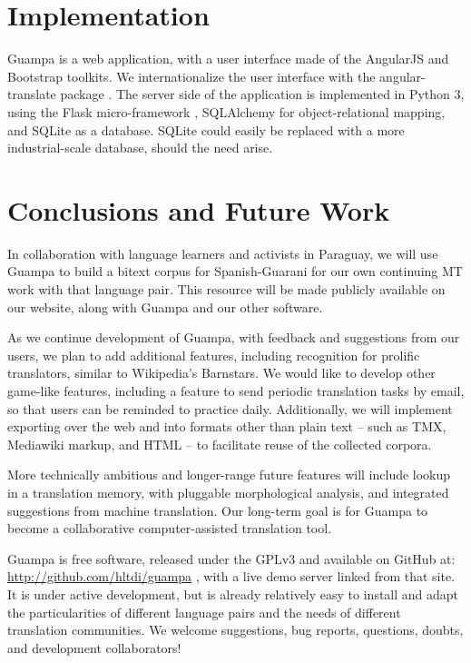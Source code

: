 \documentclass[10pt, a4paper]{article}
\begin{document}
\section{Implementation}
Guampa is a web application, with a user interface made of the AngularJS
\cite{angularjs} and Bootstrap \cite{bootstrap} toolkits. We internationalize
the user interface with the angular-translate package \cite{angular-translate}.
The server side of the application is implemented in Python 3, using the Flask
micro-framework \cite{flask}, SQLAlchemy
\cite{sqlalchemy} for object-relational mapping, and SQLite \cite{sqlite} as a
database. SQLite could easily be replaced with a more industrial-scale
database, should the need arise.

\section{Conclusions and Future Work}
In collaboration with language learners and activists in Paraguay, we will use
Guampa to build a bitext corpus for Spanish-Guarani for our own continuing MT
work with that language pair. This resource will be made publicly available on
our website, along with Guampa and our other software.

As we continue development of Guampa, with feedback and suggestions from our
users, we plan to add additional features, including recognition for prolific
translators, similar to Wikipedia's Barnstars. We would like to develop other
game-like features, including a feature to send periodic translation tasks by
email, so that users can be reminded to practice daily. Additionally, we will
implement exporting over the web and into formats other than plain text -- such
as TMX, Mediawiki markup, and HTML --  to facilitate reuse of the collected
corpora.

More technically ambitious and longer-range future features will include lookup
in a translation memory, with pluggable morphological analysis, and integrated
suggestions from machine translation. Our long-term goal is for Guampa to
become a collaborative computer-assisted translation tool.

Guampa is free software, released under the GPLv3 and available on GitHub at:
\\
\url{http://github.com/hltdi/guampa} , with a live demo server linked from that
site. It is under active development, but is already relatively easy to install
and adapt the particularities of different language pairs and the needs of
different translation communities. We welcome suggestions, bug reports,
questions, doubts, and development collaborators!



\end{document}
